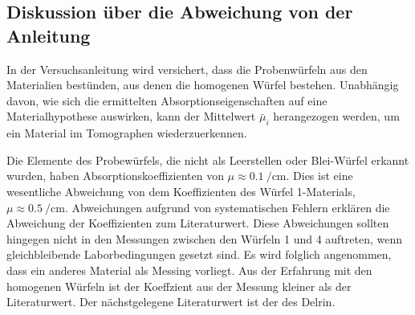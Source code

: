 \subsection{Diskussion über die Abweichung von der Anleitung}
\label{sec:Diskussion3}
In der Versuchsanleitung wird versichert, dass die Probenwürfeln aus den Materialien
bestünden, aus denen die homogenen Würfel bestehen.
Unabhängig davon, wie sich die ermittelten Absorptionseigenschaften auf eine Materialhypothese
auswirken, kann der Mittelwert $\bar\mu_i$ herangezogen werden, um ein Material
im Tomographen wiederzuerkennen.

Die Elemente des Probewürfels, die nicht als Leerstellen oder Blei-Würfel erkannt
wurden, haben Absorptionskoeffizienten von  $\mu\approx\SI{0.1}{\per\centi\meter}$.
Dies ist eine wesentliche Abweichung von dem Koeffizienten des Würfel 1-Materials,
$\mu\approx\SI{0.5}{\per\centi\meter}$.
Abweichungen aufgrund von systematischen Fehlern erklären die Abweichung der
Koeffizienten zum Literaturwert. Diese Abweichungen sollten hingegen nicht in den
Messungen zwischen den Würfeln 1 und 4 auftreten, wenn gleichbleibende
Laborbedingungen gesetzt sind. Es wird folglich angenommen, dass ein anderes Material
als Messing vorliegt.
Aus der Erfahrung mit den homogenen Würfeln ist der Koeffzient aus der Messung
kleiner als der Literaturwert. Der nächstgelegene Literaturwert ist der des Delrin.
